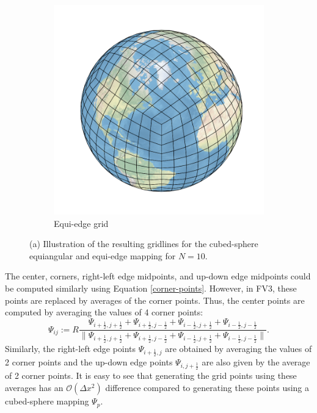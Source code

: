 \documentclass[preprint,12pt]{elsarticle}
\begin{document}
\begin{linenumbers}
\begin{figure}[!htb]
\begin{subfigure}{0.42\textwidth}
	\includegraphics[width=1.1\linewidth]{gnomonic_equiangular_cs_10_sphere}
	\caption{Equi-edge grid}
\end{subfigure}
	\caption{(a) Illustration of the resulting gridlines
		for the cubed-sphere equiangular and equi-edge mapping for $N=10$.\label{cs-grids-N10}}
\end{figure}

The center, corners, right-left edge midpoints, and up-down edge midpoints could be computed similarly using Equation \eqref{corner-points}. 
However, in FV3, these points are replaced by averages of the corner points. Thus, the center points are computed by averaging the values of 4 corner points:
\begin{equation}
	\Psi_{ij} :=
	R
	\frac{\Psi_{i+\frac{1}{2},j+\frac{1}{2}} + \Psi_{i+\frac{1}{2},j-\frac{1}{2}} + \Psi_{i-\frac{1}{2},j+\frac{1}{2}} + \Psi_{i-\frac{1}{2},j-\frac{1}{2}}}
	{\|\Psi_{i+\frac{1}{2},j+\frac{1}{2}} + \Psi_{i+\frac{1}{2},j-\frac{1}{2}} + \Psi_{i-\frac{1}{2},j+\frac{1}{2}} + \Psi_{i-\frac{1}{2},j-\frac{1}{2}}\|}.
\end{equation}
Similarly, the right-left edge points $\Psi_{i+\frac{1}{2},j}$ are obtained by averaging the values of 2 corner points
and the up-down edge points  $\Psi_{i,j+\frac{1}{2}}$ are also  given by the average of 2 corner points.
It is easy to see that generating the grid points using these averages has an $\mathcal{O}(\Delta x^2)$ difference compared to generating these points using a cubed-sphere mapping ${\Psi}_p$.


\end{linenumbers}
\end{document}
